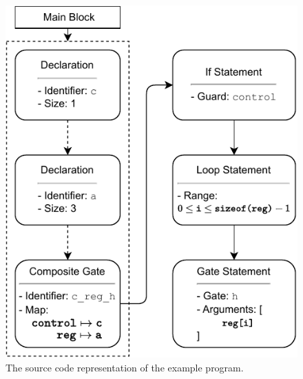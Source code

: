 \begin{figure}
    \centering     
    \begin{minipage}{.45\textwidth}
        \includegraphics[width=\textwidth]{../figures/drawio/codeGen_sourceCode_example.pdf}
        \caption{The source code representation of the example program.}
        \label{fig:codeGen_sourceCodeRep_example}
    \end{minipage}
    \hfill
    \begin{minipage}{.45\textwidth}

\end{minipage}
\end{figure}
